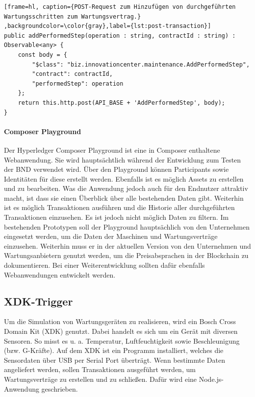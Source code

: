 \begin{lstfloat}
\begin{lstlisting}[frame=hl, caption={POST-Request zum Hinzufügen von durchgeführten Wartungsschritten zum Wartungsvertrag.} ,backgroundcolor=\color{gray},label={lst:post-transaction}]
public addPerformedStep(operation : string, contractId : string) : Observable<any> {
    const body = {
        "$class": "biz.innovationcenter.maintenance.AddPerformedStep",
        "contract": contractId,
        "performedStep": operation
    };
    return this.http.post(API_BASE + 'AddPerformedStep', body);
}
\end{lstlisting} 
\end{lstfloat}

\paragraph{Composer Playground}
Der Hyperledger Composer Playground ist eine in Composer enthaltene Webanwendung. Sie wird hauptsächtlich während der Entwicklung zum Testen der \acs{BND} verwendet wird. Über den Playground können Participants sowie Identitäten für diese erstellt werden. Ebenfalls ist es möglich Assets zu erstellen und zu bearbeiten. Was die Anwendung jedoch auch für den Endnutzer attraktiv macht, ist dass sie einen Überblick über alle bestehenden Daten gibt. Weiterhin ist es möglich Transaktionen ausführen und die Historie aller durchgeführten Transaktionen einzusehen. Es ist jedoch nicht möglich Daten zu filtern. Im bestehenden Prototypen soll der Playground hauptsächlich von den Unternehmen eingesetzt werden, um die Daten der Maschinen und Wartungsverträge einzusehen. Weiterhin muss er in der aktuellen Version von den Unternehmen und Wartungsanbietern genutzt werden, um die Preisabsprachen in der Blockchain zu dokumentieren. Bei einer Weiterentwicklung sollten dafür ebenfalls Webanwendungen entwickelt werden.

\subsection{XDK-Trigger}
Um die Simulation von Wartungsgeräten zu realisieren, wird ein Bosch Cross Domain Kit (XDK) genutzt. Dabei handelt es sich um ein Gerät mit diversen Sensoren. So misst es u. a. Temperatur, Luftfeuchtigkeit sowie Beschleunigung (bzw. G-Kräfte). Auf dem XDK ist ein Programm installiert, welches die Sensordaten über USB per Serial Port überträgt. Wenn bestimmte Daten angeliefert werden, sollen Transaktionen ausgeführt werden, um Wartungsverträge zu erstellen und zu schließen. Dafür wird eine Node.js-Anwendung geschrieben.

